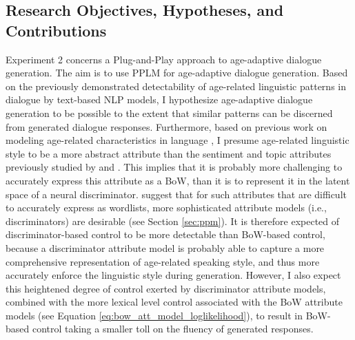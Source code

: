 \subsection{Research Objectives, Hypotheses, and Contributions}

Experiment 2 concerns a Plug-and-Play approach to age-adaptive dialogue generation.
The aim is to use PPLM for age-adaptive dialogue generation.
Based on the previously demonstrated detectability of age-related linguistic patterns in dialogue by text-based NLP models, I hypothesize age-adaptive dialogue generation to be possible to the extent that similar patterns can be discerned from generated dialogue responses.
Furthermore, based on previous work on modeling age-related characteristics in language \citep{pennebaker2003words, schler2006effects, nguyen2014gender, zheng2019personalized}, I presume age-related linguistic style to be a more abstract attribute than the sentiment and topic attributes previously studied by \cite{dathathri2019plug} and \cite{madotto-etal-2020-plug}. This implies that it is probably more challenging to accurately express this attribute as a BoW, than it is to represent it in the latent space of a neural discriminator. \cite{dathathri2019plug} suggest that for such attributes that are difficult to accurately express as wordlists, more sophisticated attribute models (i.e., discriminators) are desirable (see Section \ref{sec:ppm}). It is therefore expected of discriminator-based control to be more detectable than BoW-based control, because a discriminator attribute model is probably able to capture a more comprehensive representation of age-related speaking style, and thus more accurately enforce the linguistic style during generation. However, I also expect this heightened degree of control exerted by discriminator attribute models, combined with the more lexical level control associated with the BoW attribute models (see Equation \ref{eq:bow_att_model_loglikelihood}), to result in BoW-based control taking a smaller toll on the fluency of generated responses. 



